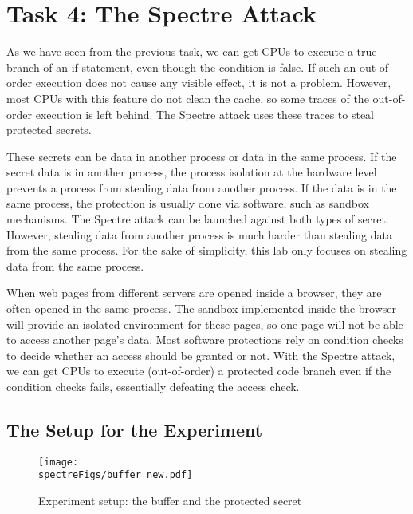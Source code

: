 \section{Task 4: The Spectre Attack}


As we have seen from the previous task, we can get CPUs to execute a true-branch of an
if statement, even though the condition is false. If such an out-of-order execution does not
cause any visible effect, it is not a problem. However, most CPUs with this feature do not
clean the cache, so some traces of the out-of-order execution is left behind. The 
Spectre attack uses these traces to steal protected secrets. 


These secrets can be data in another process or data in the same process. 
If the secret data is in another process, the process isolation at the hardware level prevents 
a process from stealing data from another process. If the data is in the same process, 
the protection is usually done via software, such as sandbox mechanisms.  
The Spectre attack can be launched against both types of secret. However, 
stealing data from another process is much harder than stealing data from the same process. For
the sake of simplicity, this lab only focuses on stealing data from the same process. 

When web pages from different servers are opened inside a browser, they are often opened in the
same process. The sandbox implemented inside the browser will provide an isolated environment
for these pages, so one page will not be able to access another page's data. 
Most software protections rely on condition checks to decide whether an access should be
granted or not. With the Spectre attack, we can get CPUs to execute (out-of-order) 
a protected code branch even if the condition checks fails, essentially defeating
the access check.


\subsection{The Setup for the Experiment} 


\begin{figure}[htb]
\centering
\texttt{[image: \\spectreFigs/buffer\_new.pdf]}
\caption{Experiment setup: the buffer and the protected secret}
\label{spectre:fig:buffer}
\end{figure}

